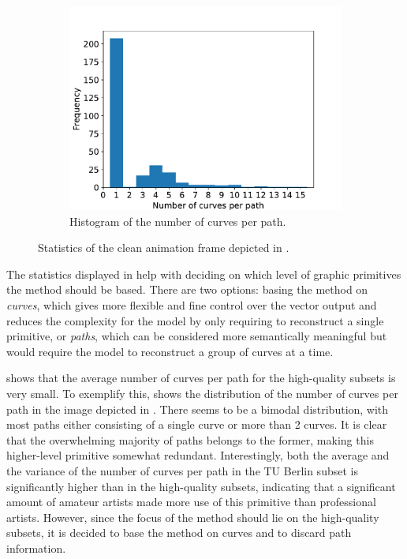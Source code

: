 \begin{figure}
\begin{subfigure}{.5\textwidth}
    \centering
    \includegraphics[width=\textwidth]{graphics/data_stats/no_curve_per_path.pdf}
    \caption{Histogram of the number of curves per path.}
    \label{fig:no_curve_per_path}
\end{subfigure}
    \caption{Statistics of the clean animation frame depicted in .}
    \label{fig:stats-49}
\end{figure}

The statistics displayed in  help with deciding on which level of graphic primitives the method should be based. There are two options: basing the method on \textit{curves}, which gives more flexible and fine control over the vector output and reduces the complexity for the model by only requiring to reconstruct a single primitive, or \textit{paths}, which can be considered more semantically meaningful but would require the model to reconstruct a group of curves at a time. 

  shows that the average number of curves per path for the high-quality subsets is very small. To exemplify this,  shows the distribution of the number of curves per path in the image depicted in . There seems to be a bimodal distribution, with most paths either consisting of a single curve or more than 2 curves. It is clear that the overwhelming majority of paths belongs to the former, making this higher-level primitive somewhat redundant. Interestingly, both the average and the variance of the number of curves per path in the TU Berlin subset is significantly higher than in the high-quality subsets, indicating that a significant amount of amateur artists made more use of this primitive than professional artists. However, since the focus of the method should lie on the high-quality subsets, it is decided to base the method on curves and to discard path information.

